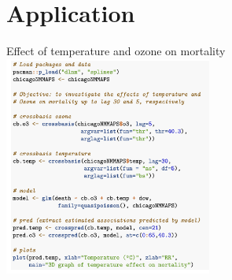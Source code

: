 \documentclass[english]{beamer}
\begin{document}
\section{Application}
\begin{frame}{Effect of temperature and ozone on mortality}
\centering
    \includegraphics[width=6.83cm,keepaspectratio]{images/code_example_1.png}
\end{frame}
\end{document}
